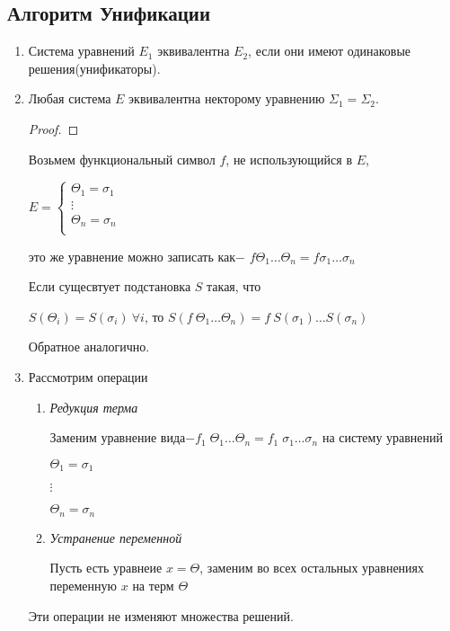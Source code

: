 		\subsection{Алгоритм Унификации}
		\begin{enumerate}
			\item Система уравнений $E_1$ эквивалентна $E_2$, если они имеют одинаковые решения(унификаторы).
			\item Любая система $E$ эквивалентна некторому уравнению $\Sigma_1=\Sigma_2$.
					
	\begin{proof}
	
	\end{proof}
		Возьмем функциональный символ $f$, не использующийся в $E$, \par
		$		
		E=\begin{cases}			
			\Theta_1=\sigma_1&\\
			\vdots&\\
			\Theta_n=\sigma_n&\\
		\end{cases}
		$\par
		это же уравнение можно записать как$-$ $f \Theta_1 \hdots \Theta_n=f\sigma_1 \hdots\sigma_n$\par 
		Если сущесвтует подстановка $S$ такая, что\par $S(\Theta_i)=S(\sigma_i)\:\forall i$, 
		то $S(f\:\Theta_1 \hdots \Theta_n)=f\:S(\sigma_1) \hdots S(\sigma_n)$\par Обратное аналогично.
		\item Рассмотрим операции
		\begin{enumerate}
			\item \textit{Редукция терма} \par 
					Заменим уравнение вида$-f_1\;\Theta_1 \hdots\Theta_n=f_1\;\sigma_1\hdots\sigma_n$ на систему уравнений\par$\Theta_1=\sigma_1$\par$\vdots$\par$\Theta_n=\sigma_n$
			\item \textit{Устранение переменной} \par
			Пусть есть уравнеие $x=\Theta$, заменим во всех остальных уравнениях переменную $x$ на терм $\Theta$		
		\end{enumerate}
		\begin{statement} Эти операции не изменяют множества решений.\end{statement}
	\end{enumerate}	
